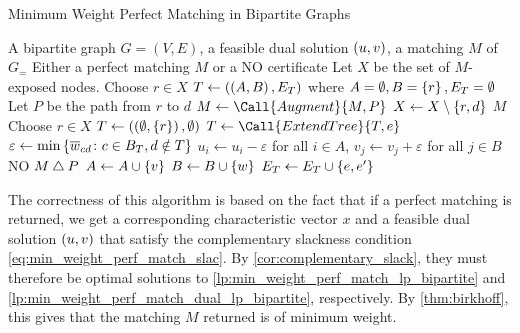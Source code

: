 \begin{algorithm}[!h]
    \caption{Minimum Weight Perfect Matching in Bipartite Graphs} \label{alg:min_weight_perf_match_bi}  
    \begin{algorithmic}[1]
        \Algin A bipartite graph $G = (V, E)$, a feasible dual solution $\left( u, v \right)$, a matching $M$ of $G_=$
        \Algout Either a perfect matching $M$ or a NO certificate
        \State Let $X$ be the set of $M$-exposed nodes. Choose $r \in X$
        \State $T \gets \left( \left( A, B \right), E_T \right)$ where $A = \emptyset, B = \left\{ r \right\}, E_T = \emptyset$  
                  
                    \State Let $P$ be the path from $r$ to $d$  
                    \State $M \gets \Call{Augment}{M, P}$
                    \State $X \gets X \setminus \left\{ r, d \right\}$
                        \State \Return $M$ 
                    \Else 
                        \State Choose $r \in X$
                        \State $T \gets \left( \left( \emptyset, \left\{ r \right\} \right), \emptyset \right)$ 
                    \EndIf 
                \Else 
                    \State $T \gets \Call{ExtendTree}{T, e}$
                \EndIf
            \EndWhile
            \State $\varepsilon \gets \min \left\{ \overline{w}_{cd} \colon c \in B_T, d \notin T \right\}$
            \State $u_i \gets u_i - \varepsilon$ for all $i \in A$, $v_j \gets v_j + \varepsilon$ for all $j \in B$
        \EndWhile
        \State \Return NO 
        \Statex
            \State $ M \bigtriangleup P$
        \EndProcedure
        \Statex
                \State $A \gets A \cup \left\{ v \right\}$
                \State $B \gets B \cup \left\{ w \right\}$    
                \State $E_T \gets E_T \cup \left\{ e, e^\prime \right\}$
            \EndIf
        \EndProcedure
    \end{algorithmic}
\end{algorithm}

The correctness of this algorithm is based on the fact that if a perfect matching is returned,
we get a corresponding characteristic vector $x$ and a feasible dual solution $\left( u, v \right)$ that satisfy 
the complementary slackness condition \cref{eq:min_weight_perf_match_slac}. By \cref{cor:complementary_slack}, they must 
therefore be optimal solutions to \cref{lp:min_weight_perf_match_lp_bipartite} and \cref{lp:min_weight_perf_match_dual_lp_bipartite}, respectively. 
By \cref{thm:birkhoff}, this gives that the matching $M$ returned is of minimum weight. 

